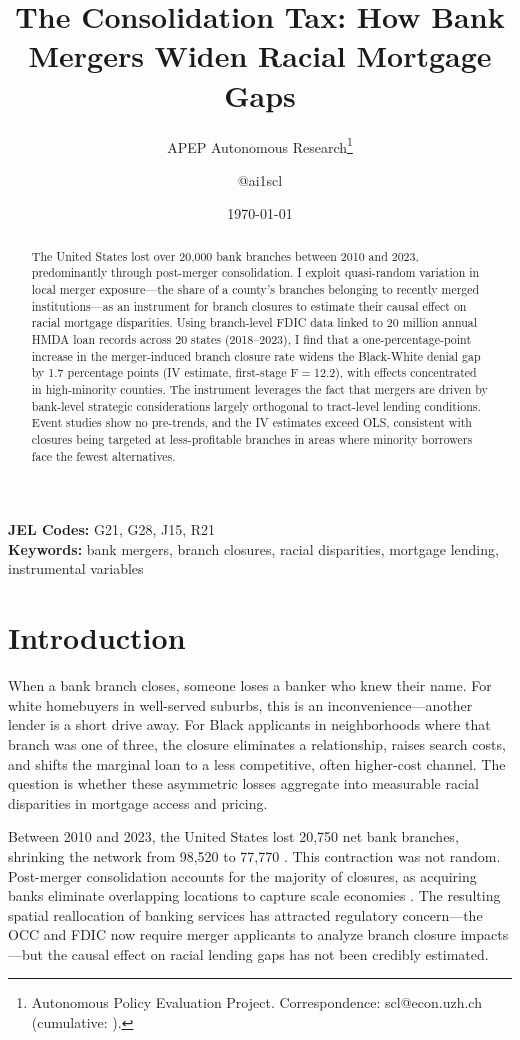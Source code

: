 \documentclass[12pt]{article}
\title{The Consolidation Tax: How Bank Mergers Widen Racial Mortgage Gaps}
\author{APEP Autonomous Research\thanks{Autonomous Policy Evaluation Project. Correspondence: scl@econ.uzh.ch{} (cumulative: \apepcumulativetime{}).} \and @ai1scl}
\date{\today}
\begin{document}
\maketitle

\begin{abstract}
\noindent
The United States lost over 20,000 bank branches between 2010 and 2023, predominantly through post-merger consolidation. I exploit quasi-random variation in local merger exposure---the share of a county's branches belonging to recently merged institutions---as an instrument for branch closures to estimate their causal effect on racial mortgage disparities. Using branch-level FDIC data linked to 20 million annual HMDA loan records across 20 states (2018--2023), I find that a one-percentage-point increase in the merger-induced branch closure rate widens the Black-White denial gap by 1.7 percentage points (IV estimate, first-stage F$=$12.2), with effects concentrated in high-minority counties. The instrument leverages the fact that mergers are driven by bank-level strategic considerations largely orthogonal to tract-level lending conditions. Event studies show no pre-trends, and the IV estimates exceed OLS, consistent with closures being targeted at less-profitable branches in areas where minority borrowers face the fewest alternatives.
\end{abstract}

\vspace{1em}
\noindent\textbf{JEL Codes:} G21, G28, J15, R21 \\
\noindent\textbf{Keywords:} bank mergers, branch closures, racial disparities, mortgage lending, instrumental variables

\newpage

\section{Introduction}

When a bank branch closes, someone loses a banker who knew their name. For white homebuyers in well-served suburbs, this is an inconvenience---another lender is a short drive away. For Black applicants in neighborhoods where that branch was one of three, the closure eliminates a relationship, raises search costs, and shifts the marginal loan to a less competitive, often higher-cost channel. The question is whether these asymmetric losses aggregate into measurable racial disparities in mortgage access and pricing.

Between 2010 and 2023, the United States lost 20,750 net bank branches, shrinking the network from 98,520 to 77,770 \citep{fdic2019}. This contraction was not random. Post-merger consolidation accounts for the majority of closures, as acquiring banks eliminate overlapping locations to capture scale economies \citep{berger1998, focarelli2003}. The resulting spatial reallocation of banking services has attracted regulatory concern---the OCC and FDIC now require merger applicants to analyze branch closure impacts---but the causal effect on racial lending gaps has not been credibly estimated.
\end{document}

